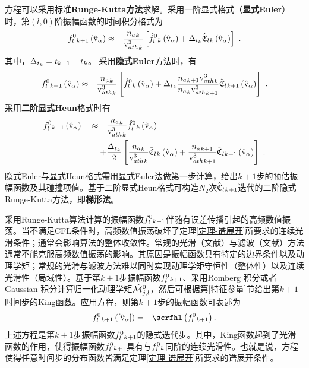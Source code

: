   方程可以采用标准\textbf{Runge-Kutta方法}求解。采用一阶显式格式（\textbf{显式Euler}）时，第$(l,0)$阶振幅函数的时间积分格式为
  \begin{eqnarray}
      {f_l^0}{_{k+1}}\left(\hat{\mathrm{v}}_{\alpha} \right) &\approx& \frac{{n_a}_k}{{\mathrm{v}^3_{ath}}_k} \left[ {\hat{f}_l^0}{_k}\left(\hat{\mathrm{v}}_{\alpha} \right) + {\Delta}_{t_k} {\hat{\mathfrak{C}}_l}{_k}\left(\hat{\mathrm{v}}_{\alpha} \right) \right] ~. \label{flk1fhlkRK1exKing}
  \end{eqnarray}
  其中，${\Delta}_{t_k}=t_{k+1}-t_k$。
  采用\textbf{隐式Euler}方法时，有
  \begin{eqnarray}
      {f_l^0}{_{k+1}} \left(\hat{\mathrm{v}}_{\alpha} \right) &\approx& \frac{{n_a}_k}{{\mathrm{v}^3_{ath}}_k} \left[ {\hat{f}_l^0}{_k} \left(\hat{\mathrm{v}}_{\alpha} \right) + {\Delta}_{t_k}  \frac{{n_a}_{k+1} {\mathrm{v}^3_{ath}}_k}{{n_a}_k {\mathrm{v}^3_{ath}}_{k+1}}  {\hat{\mathfrak{C}}_l}{_{k+1}} \left(\hat{\mathrm{v}}_{\alpha} \right) \right] ~. \label{flk1fhlkRK1imKing}
  \end{eqnarray}
  采用\textbf{二阶显式Heun}格式时有
  \begin{eqnarray}
  \begin{aligned}
      {f_l^0}{_{k+1}} \left(\hat{\mathrm{v}}_{\alpha} \right) \quad \approx \quad & \frac{{n_a}_k}{{\mathrm{v}^3_{ath}}_k} {\hat{f}_l^0}{_k} \left(\hat{\mathrm{v}}_{\alpha} \right) 
      \\
      + & \frac{{\Delta}_{t_k}}{2} \left[ \frac{{n_a}_k}{{\mathrm{v}^3_{ath}}_k} {\hat{\mathfrak{C}}_l}{_k} \left(\hat{\mathrm{v}}_{\alpha} \right) + \frac{{n_a}_{k+1}}{{\mathrm{v}^3_{ath}}_{k+1}}  {\hat{\mathfrak{C}}_l}{_{k+1}} \left(\hat{\mathrm{v}}_{\alpha} \right) \right] ~. \label{flk1fhlkRK2exKing}
  \end{aligned}
  \end{eqnarray}
  隐式Euler与显式Heun格式需用显式Euler法做第一步计算，给出$k+1$步的预估振幅函数及其碰撞项值。基于二阶显式Heun格式可构造$N_2$次${\hat{\mathfrak{C}}_l}{_{k+1}}$迭代的二阶隐式Runge-Kutta方法，即\textbf{梯形法}。

  采用Runge-Kutta算法计算的振幅函数${f_l^0}{_{k+1}}$伴随有误差传播引起的高频数值振荡。当不满足CFL条件时，高频数值振荡破坏了定理\ref{定理-谱展开}所要求的连续光滑条件；通常会影响算法的整体收敛性。常规的光滑（文献）与滤波（文献）方法通常不能克服高频数值振荡的影响。其原因是振幅函数具有特定的边界条件以及动理学矩；常规的光滑与滤波方法难以同时实现动理学矩守恒性（整体性）以及连续光滑性（局域性）。基于第$k+1$步振幅函数${f_l^0}{_{k+1}}$、采用Romberg 积分或者 Gaussian 积分计算归一化动理学矩${\hat{\mathcal{M}}}{_{j,l}^0}$，然后可根据第\ref{特征参量}节给出第$k+1$时间步的King函数。应用方程，则第$k+1$步的振幅函数可表述为
  \begin{eqnarray}
      \flkI \left([\rmvhA] \right) & = & \scrfhl \left(\flkI \right). \label{flkIflkI}
  \end{eqnarray}
  上述方程是第$k+1$步振幅函数${f_l^0}{_{k+1}}$的隐式迭代步。其中，King函数起到了光滑函数的作用，使得振幅函数${f_l^0}{_{k+1}}$具有与${f_l^0}{_k}$同阶的连续光滑性。也就是说，方程使得任意时间步的分布函数皆满足定理\ref{定理-谱展开}所要求的谱展开条件。

